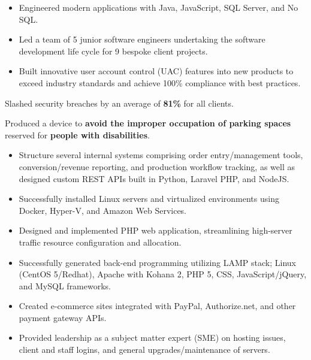 	\begin{itemize}
            \item Engineered modern applications with Java, JavaScript, SQL Server, and No SQL.
            \item Led a team of 5 junior software engineers undertaking the software development life cycle for 9 bespoke client projects.
            \item Built innovative user account control (UAC) features into new products to exceed industry standards and achieve 100\% compliance with best practices.
	\end{itemize}
        Slashed security breaches by an average of \textbf{81\%} for all clients.
	
	\medskip

        Produced a device to \textbf{avoid the improper occupation of parking spaces} reserved for \textbf{people with disabilities}.
	\begin{itemize}
		\item Structure several internal systems comprising order entry/management tools, conversion/revenue reporting, and production workflow tracking, as well as designed custom REST APIs built in Python, Laravel PHP, and NodeJS.
            \item Successfully installed Linux servers and virtualized environments using Docker, Hyper-V, and Amazon Web Services.
            \item Designed and implemented PHP web application, streamlining high-server traffic resource configuration and allocation.
	\end{itemize}
        	
	\medskip
	
	\begin{itemize}
		\item Successfully generated back-end programming utilizing LAMP stack; Linux (CentOS 5/Redhat), Apache with Kohana 2, PHP 5, CSS, JavaScript/jQuery, and MySQL frameworks.
            \item Created e-commerce sites integrated with PayPal, Authorize.net, and other payment gateway APIs.
		\item Provided leadership as a subject matter expert (SME) on hosting issues, client and staff logins, and general upgrades/maintenance of servers.
	\end{itemize}